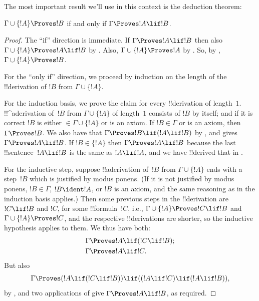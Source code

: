 The most important result we'll use in this context is the deduction
theorem:

\begin{thm}
 $\Gamma \cup \{!A\} \Proves !B$ if and
only if $\Gamma \Proves !A \lif !B$.
\end{thm}

\begin{proof}
The ``if'' direction is immediate.  If $\Gamma \Proves !A \lif !B$
then also $\Gamma \cup \{!A\} \Proves !A \lif !B$ by
.  Also, $\Gamma \cup \{!A\} \Proves !A$ by
. So, by , $\Gamma \cup
\{!A\} \Proves !B$.

For the ``only if'' direction, we proceed by induction on the length
of the !!{derivation} of $!B$ from $\Gamma \cup \{!A\}$.

For the induction basis, we prove the claim for every !!{derivation}
of length~$1$. !!^a{derivation} of~$!B$ from $\Gamma \cup \{!A\}$ of
length~$1$ consists of $!B$ by itself; and if it is correct $!B$ is
either $\in \Gamma \cup \{!A\}$ or is an axiom.  If $!B \in \Gamma$ or
is an axiom, then $\Gamma \Proves !B$. We also have that $\Gamma
\Proves !B \lif (!A \lif !B)$ by , and
 gives $\Gamma \Proves !A \lif !B$. If $!B \in \{ !A\}$
then $\Gamma \Proves !A \lif !B$ because the last !!{sentence}~$!A
\lif !B$ is the same as $!A \lif !A$, and we have !!{derive}d that in
.

For the inductive step, suppose !!a{derivation} of~$!B$ from
$\Gamma \cup \{!A\}$ ends with a step~$!B$ which is justified by modus
ponens. (If it is not justified by modus ponens, $!B \in \Gamma$, $!B
\ident !A$, or $!B$ is an axiom, and the same reasoning as in the
induction basis applies.) Then some previous steps in the
!!{derivation} are $!C \lif !B$ and $!C$, for some !!{formula}~$!C$,
i.e., $\Gamma \cup \{!A\} \Proves !C \lif !B$ and $\Gamma \cup \{!A\}
\Proves !C$, and the respective !!{derivation}s are shorter, so the
inductive hypothesis applies to them. We thus have both:
\begin{align*}
  & \Gamma \Proves !A \lif (!C \lif !B); \\
  & \Gamma \Proves !A \lif !C.
\end{align*}
But also
\[
\Gamma \Proves (!A \lif (!C \lif !B)) \lif
((!A\lif !C)  \lif (!A \lif !B)),
\]
by , and two applications of  give
$\Gamma \Proves !A \lif !B$, as required.
\end{proof}

